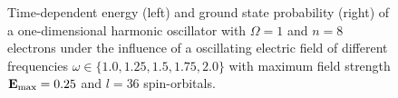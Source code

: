 \begin{figure}[!h]
    \centering
    \caption{Time-dependent energy (left) and ground state probability (right)
        of a one-dimensional harmonic oscillator with $\Omega=1$
        and $n=8$ electrons under the influence of a oscillating electric field 
        of different frequencies $\omega\in\{1.0, 1.25, 1.5, 1.75, 2.0\}$ with 
        maximum field strength $\vb{E}_\text{max}=0.25$ and $l=36$ 
        spin-orbitals.
    }
    \label{fig:1d_n8_qd_resonance}
\end{figure}


